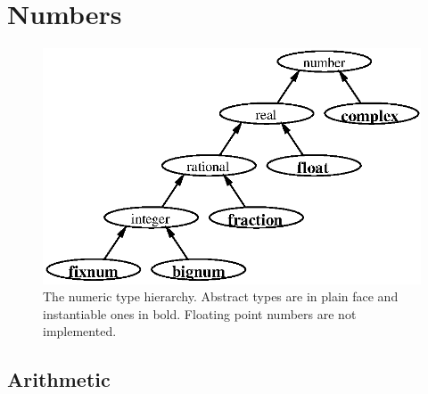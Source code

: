 %
%
%


\chapter{Numbers} \label{numbers}

  
  
  

\begin{figure}[h]
\centering\includegraphics{numhier}
\caption{The numeric type hierarchy.  Abstract types are in plain face
and instantiable ones in bold.  Floating point numbers are not
implemented.} \label{fig:numhier}
\end{figure}

\section{Arithmetic}



